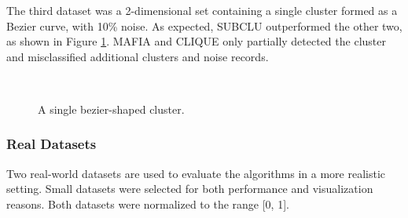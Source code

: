 The third dataset was a 2-dimensional set containing a single cluster formed as a Bezier curve, with 10\% noise. As expected, SUBCLU outperformed the other two, as shown in Figure \ref{fig:accuracy_bezier}. MAFIA and CLIQUE only partially detected the cluster and misclassified additional clusters and noise records.
\begin{figure}[H]
    \vspace*{-0.6cm}
    \hspace*{-0.6cm}
    \centering
    ~~
    ~~
    \caption{A single bezier-shaped cluster.}
    \label{fig:accuracy_bezier}
\end{figure}

\subsubsection{Real Datasets}
Two real-world datasets are used to evaluate the algorithms in a more realistic setting. Small datasets were selected for both performance and visualization reasons. Both datasets were normalized to the range [0, 1].

